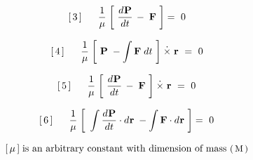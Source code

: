 \documentclass[10pt,fleqn]{article}
\begin{document}
\par \vspace{+0.15em}
\begin{eqnarray*}
\hspace{+1.17em} [\,3\,] \;\;\;\;\;\; \dfrac{1}{\mu} \; \bigg [ \,\, \dfrac{d\hspace{+0.045em}\mathbf{P}}{d\hspace{+0.012em}t} \, - \; \mathbf{F} \,\, \bigg ] =~ 0
\end{eqnarray*}
\par \vspace{+0.15em}
\begin{eqnarray*}
\hspace{+1.17em} [\,4\,] \;\;\;\;\;\; \dfrac{1}{\mu} \; \bigg [ \,\, \mathbf{P} \; - \int \mathbf{F} \; d\hspace{+0.012em}t \,\, \bigg ] \hspace{+0.24em}\dot{\times}\hspace{+0.30em} \mathbf{r} ~=~ 0
\end{eqnarray*}
\par \vspace{+0.15em}
\begin{eqnarray*}
\hspace{+1.17em} [\,5\,] \;\;\;\;\;\; \dfrac{1}{\mu} \; \bigg [ \,\, \dfrac{d\hspace{+0.045em}\mathbf{P}}{d\hspace{+0.012em}t} \, - \; \mathbf{F} \,\, \bigg ] \hspace{+0.24em}\dot{\times}\hspace{+0.30em} \mathbf{r} ~=~ 0
\end{eqnarray*}
\par \vspace{+0.15em}
\begin{eqnarray*}
\hspace{+1.17em} [\,6\,] \;\;\;\;\;\; \dfrac{1}{\mu} \; \bigg [ \,\, \int \dfrac{d\hspace{+0.045em}\mathbf{P}}{d\hspace{+0.012em}t} \cdot d\hspace{+0.036em}\mathbf{r} \; - \int \mathbf{F} \cdot d\hspace{+0.036em}\mathbf{r} \,\, \bigg ] =~ 0
\end{eqnarray*}
\par \vspace{+0.33em}
\begin{eqnarray*}
\hspace{+1.17em} [\,\mu\,] \; \textrm{is an arbitrary constant with dimension of mass {\small $( \, \mathrm{M} \, )$}}
\end{eqnarray*}
\end{document}

